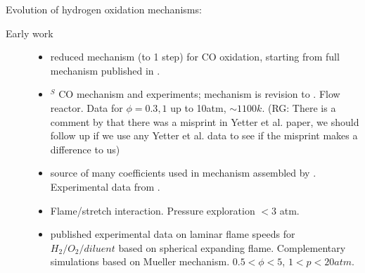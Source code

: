 \documentclass[preprint,3p,times,twocolumn]{elsarticle}
\begin{document}
Evolution of hydrogen oxidation mechanisms:
        \begin{description}
            \item[Early work]
              \begin{itemize}
              \item \citet{WangR93} reduced mechanism (to 1 step) for
                CO oxidation, starting from full mechanism published
                in \citet{PetersR93}.
              \item$^S$ \citet{KimYD94}  CO mechanism and experiments; mechanism is
                revision to \citet{YetterDR91}. Flow reactor. Data for $\phi=0.3,1$
                up to 10atm, $\sim 1100k$. (RG: There is a comment by
                \cite{Konnov08} that there was a misprint in Yetter et
                al. paper, we should follow up if we use any Yetter et
                al. data to see if the misprint makes a difference to us)
              \item  \citet{TsangH86} source of many coefficients used
                in mechanism assembled by \citet{MuellerKYD99}. Experimental
                data from \citet{AungHF97, AungHF98}.
                \item \citet{KwonF01} Flame/stretch
                  interaction. Pressure exploration $<3$ atm.
                  \item \citet{TseZL00} published experimental data on
                    laminar flame speeds for $H_2/O_2/diluent$ based
                    on spherical expanding flame. Complementary
                    simulations based on Mueller mechanism. $0.5 <
                    \phi < 5$, $1 < p < 20atm$.
              \end{itemize}
                

\end{description}
\end{document}

